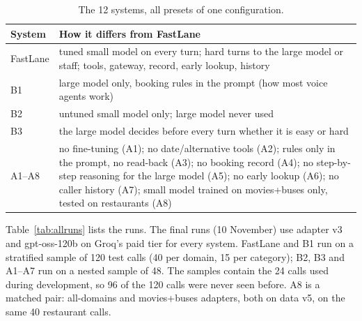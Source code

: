 \documentclass[11pt,a4paper]{article}
\makeatletter
\renewcommand\paragraph{\@startsection{paragraph}{4}{\z@}{1.0ex plus 0.5ex minus 0.2ex}{-1em}{\normalsize\bfseries}}
\makeatother
\begin{document}
\begin{table}[tbp]
\centering\small
\begin{tabularx}{\linewidth}{@{}lL@{}}
\toprule
System & How it differs from FastLane \\
\midrule
FastLane & tuned small model on every turn; hard turns to the large model or staff; tools, gateway, record, early lookup, history \\
B1 & large model only, booking rules in the prompt (how most voice agents work) \\
B2 & untuned small model only; large model never used \\
B3 & the large model decides before every turn whether it is easy or hard \\
A1--A8 & no fine-tuning (A1); no date/alternative tools (A2); rules only in the prompt, no read-back (A3); no booking record (A4); no step-by-step reasoning for the large model (A5); no early lookup (A6); no caller history (A7); small model trained on movies+buses only, tested on restaurants (A8) \\
\bottomrule
\end{tabularx}
\caption{The 12 systems, all presets of one configuration.}
\label{tab:systems}
\end{table}

\paragraph{Runs.} Table~\ref{tab:allruns} lists the runs. The final runs (10 November) use adapter v3 and
gpt-oss-120b on Groq's paid tier for every system. FastLane and B1 run on a stratified sample of 120 test calls (40 per
domain, 15 per category); B2, B3 and A1--A7 run on a nested sample of 48. The samples contain the 24 calls used during
development, so 96 of the 120 calls were never seen before. A8 is a matched pair: all-domains and movies+buses
adapters, both on data v5, on the same 40 restaurant calls.
\end{document}
